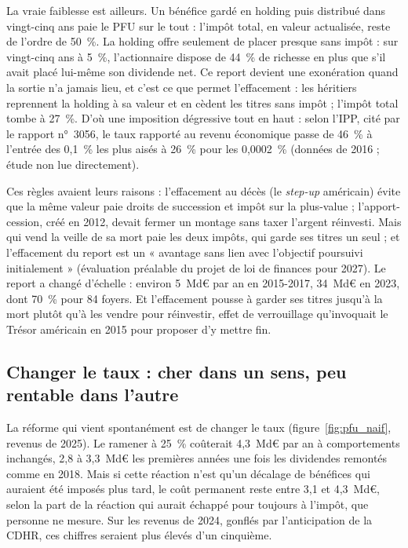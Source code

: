 \documentclass[11pt,a4paper]{article}
\begin{document}
La vraie faiblesse est ailleurs. Un bénéfice gardé en holding puis distribué dans vingt-cinq ans paie le PFU sur le
tout : l'impôt total, en valeur actualisée, reste de l'ordre de 50~\%. La holding offre seulement de placer presque
sans impôt : sur vingt-cinq ans à 5~\%, l'actionnaire dispose de 44~\% de richesse en plus que s'il avait placé
lui-même son dividende net. Ce report devient une exonération quand la sortie n'a jamais lieu, et c'est ce que
permet l'effacement : les héritiers reprennent la holding à sa valeur et en cèdent les titres sans impôt ; l'impôt
total tombe à 27~\%. D'où une imposition dégressive tout en haut : selon l'IPP, cité par le rapport n°~3056, le taux
rapporté au revenu économique passe de 46~\% à l'entrée des 0,1~\% les plus aisés à 26~\% pour les 0,0002~\%
(données de 2016 ; étude non lue directement).

Ces règles avaient leurs raisons : l'effacement au décès (le \emph{step-up} américain) évite que la même valeur
paie droits de succession et impôt sur la plus-value ; l'apport-cession, créé en 2012, devait fermer un montage sans
taxer l'argent réinvesti. Mais qui vend la veille de sa mort paie les deux impôts, qui garde ses titres un seul ; et l'effacement du report est un « avantage sans lien avec l'objectif
poursuivi initialement » (évaluation préalable du projet de loi de finances pour 2027). Le report a changé
d'échelle : environ 5~Md€ par an en 2015-2017, 34~Md€ en 2023, dont 70~\% pour 84 foyers. Et l'effacement pousse à
garder ses titres jusqu'à la mort plutôt qu'à les vendre pour réinvestir, effet de verrouillage qu'invoquait le
Trésor américain en 2015 pour proposer d'y mettre fin.

\subsection{Changer le taux : cher dans un sens, peu rentable dans l'autre}\label{sec:pfu_naif}

La réforme qui vient spontanément est de changer le taux (figure~\ref{fig:pfu_naif}, revenus de 2025). Le ramener à
25~\% coûterait 4,3~Md€ par an à comportements inchangés, 2,8 à 3,3~Md€ les premières années une fois les dividendes
remontés comme en 2018. Mais si cette réaction n'est qu'un décalage de bénéfices qui auraient été imposés plus tard,
le coût permanent reste entre 3,1 et 4,3~Md€, selon la part de la réaction qui aurait échappé pour toujours à
l'impôt, que personne ne mesure. Sur les revenus de 2024, gonflés par l'anticipation de la CDHR, ces chiffres
seraient plus élevés d'un cinquième.
\end{document}
